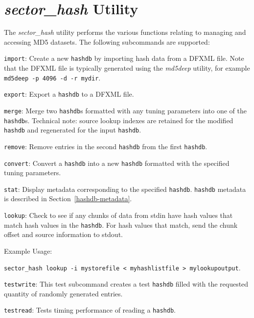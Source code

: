 \documentclass[10pt,twoside]{article}
\newcommand{\sh}{\emph{sector\_hash}\xspace}
\newcommand{\hdb}{\texttt{hashdb}\xspace}
\newcommand{\mdd}{\emph{md5deep}\xspace}
\begin{document}
\section{\sh Utility}
The \sh utility performs the various functions relating to managing and accessing MD5 datasets.
The following subcommands are supported:
\begin{compactitem}
\item \texttt{import}:
Create a new \hdb by importing hash data from a DFXML file.
Note that the DFXML file is typically generated using the \mdd utility,
for example \texttt{md5deep -p 4096 -d -r mydir}.
\item \texttt{export}:
Export a \hdb to a DFXML file.
\item \texttt{merge}:
Merge two {\hdb}s formatted with any tuning parameters
into one of the {\hdb}s.
Technical note: source lookup indexes are retained for the modified \hdb
and regenerated for the input \hdb.
\item \texttt{remove}:
Remove entries in the second \hdb from the first \hdb.
\item \texttt{convert}:
Convert a \hdb into a new \hdb formatted with the specified tuning parameters.
\item \texttt{stat}:
Display metadata corresponding to the specified \hdb.
\hdb metadata is described in Section~\ref{hashdb-metadata}.
\item \texttt{lookup}:
Check to see if any chunks of data from stdin
have hash values that match hash values in the \hdb.
For hash values that match, send the chunk offset and source information to stdout.

Example Usage:

\texttt{sector\_hash lookup -i mystorefile < myhashlistfile > mylookupoutput}.

\item \texttt{testwrite}:
This test subcommand creates a test \hdb
filled with the requested quantity of randomly generated entries.
\item \texttt{testread}:
Tests timing performance of reading a \hdb.
\end{compactitem}
\end{document}
